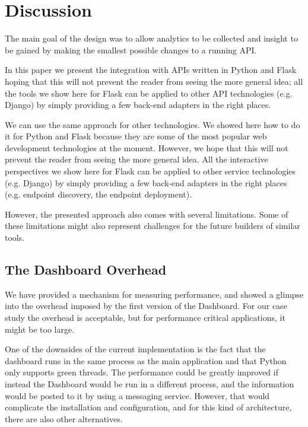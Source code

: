 
\section{Discussion}



  The main goal of the \tool design was to allow analytics to be collected and insight to be gained by making the smallest possible changes to a running API. 

  In this paper we present the integration with APIs written in Python and Flask hoping that this will not prevent the reader from seeing the more general idea; all the tools we show here for Flask can be applied to other API technologies (e.g. Django) by simply providing a few back-end adapters in the right places.


  We can use the same approach for other technologies. We showed here how to do it for Python and Flask because they are some of the most popular web development technologies at the moment. However, we hope that this will not prevent the reader from seeing the more general idea. All the interactive perspectives we show here for Flask can be applied to other service technologies (e.g. Django) by simply providing a few back-end adapters in the right places (e.g. endpoint discovery, the  endpoint deployment). 

  However, the presented approach also comes with several limitations. Some of these limitations might also represent challenges for the future builders of similar tools.

  \subsection*{The Dashboard Overhead}

    We have provided a mechanism for measuring performance, and showed a glimpse into the overhead imposed by the first version of the Dashboard. For our case study the overhead is acceptable, but for performance critical applications, it might be too large. 

    One of the downsides of the current implementation is the fact that the dashboard runs in the same process as the main application and that Python only supports green threads. The performance could be greatly improved if instead the Dashboard would be run in a different process, and the information would be posted to it by using a messaging service. However, that would complicate the installation and configuration, and for this kind of architecture, there are also other alternatives.


